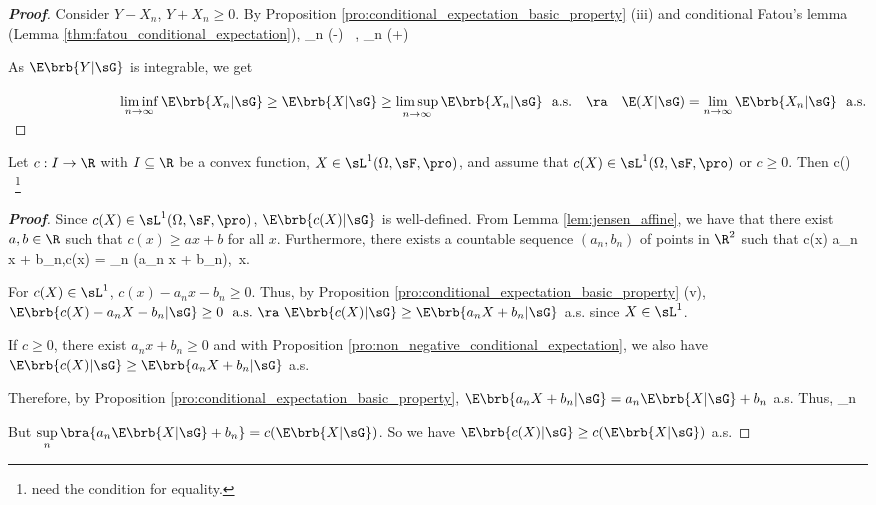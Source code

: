 \begin{proof}[\bf Proof]
Consider $Y - X_n$, $Y + X_n \geq 0$. By Proposition \ref{pro:conditional_expectation_basic_property} (iii) and conditional Fatou's lemma (Lemma \ref{thm:fatou_conditional_expectation}),
\be
\E{} \leq \liminf_{n\to \infty} (\E{}-\E{}) \ ,\quad\quad \E{} \leq \liminf_{n\to \infty} (\E{}+\E{}) \ 
\ee

As $\E\brb{Y |\sG}$ is integrable, we get
\vspace{2mm}

$\qquad\qquad\qquad\qquad\liminf\limits_{n\to \infty} \E\brb{X_n | \sG} \geq \E\brb{X | \sG} \geq \limsup\limits_{n\to \infty} \E\brb{X_n | \sG} \ \text{ a.s.}\quad \ra\quad \E(X|\sG) = \lim\limits_{n\to \infty} \E\brb{X_n | \sG}\ \text{ a.s.}$
\end{proof}

\begin{theorem}\label{thm:jensen_inequality_conditional_expectation}
Let $c : I \to \R$ with $I\subseteq \R$ be a convex function, $X \in \sL^1(\Omega,\sF,\pro)$, and assume that $c(X) \in \sL^1(\Omega,\sF,\pro)$ or $c\geq 0$. Then
\be
c(\E{}) \leq \E{}\ \footnote{need the condition for equality.}
\ee
\end{theorem}

\begin{proof}[\bf Proof]
Since $c(X)\in \sL^1(\Omega,\sF,\pro)$, $\E\brb{c(X) | \sG}$ is well-defined. From Lemma \ref{lem:jensen_affine}, we have that there exist $a,b\in \R$ such that $c(x) \geq ax + b$ for all $x$. Furthermore, there exists a countable sequence $(a_n,b_n)$ of points in $\R^2$ such that
\be
c(x) \geq a_n x + b_n,\quad\quad c(x) = \sup_n (a_n x + b_n),\ x\in \R.
\ee

For $c(X)\in \sL^1$, $c(x) - a_n x - b_n\geq 0$. Thus, by Proposition \ref{pro:conditional_expectation_basic_property} (v), $\E\brb{c(X)-a_nX -b_n|\sG} \geq 0 \ \text{ a.s.}\ \ra\ \E\brb{c(X)|\sG} \geq \E\brb{a_nX+b_n|\sG}$ a.s. since $X\in \sL^1$.

If $c\geq 0$, there exist $a_n x + b_n \geq 0$ and with Proposition \ref{pro:non_negative_conditional_expectation}, we also have $\E\brb{c(X)|\sG} \geq \E\brb{a_nX+b_n|\sG}$ a.s.

Therefore, by Proposition \ref{pro:conditional_expectation_basic_property}, $\E\brb{a_nX+b_n|\sG} = a_n\E\brb{X|\sG}+b_n$ a.s. Thus,
\be
\E{} \geq \sup_n \ 
\ee

But $\sup\limits_n\bra{ a_n\E\brb{X|\sG}+b_n} = c(\E\brb{X|\sG})$. So we have $\E\brb{c(X)|\sG} \geq c(\E\brb{X|\sG})$ a.s.
\end{proof}

